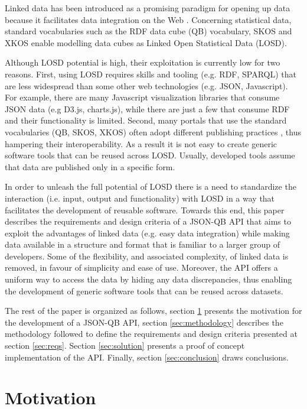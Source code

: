\documentclass{llncs}
\begin{document}
Linked data has been introduced as a promising paradigm for opening up data because it facilitates data integration on the Web \cite{Bizer:2009}. Concerning statistical data, standard vocabularies such as the RDF data cube (QB) vocabulary\cite{Cyganiak:2014:W3C}, SKOS\cite{Miles:2009:W3C} and XKOS\cite{XKOS} enable modelling data cubes as Linked Open Statistical Data (LOSD). 

Although LOSD potential is high, their exploitation is currently low for two reasons. First, using LOSD requires skills and tooling (e.g. RDF, SPARQL) that are less widespread than some other web technologies (e.g. JSON, Javascript). For example, there are many Javascript visualization libraries that consume JSON data (e.g D3.js, charts.js), while there are just a few that consume RDF and their functionality is limited. Second, many portals that use the standard vocabularies (QB, SKOS, XKOS) often adopt different publishing practices \cite{KalampokisChallenges}, thus hampering their interoperability. As a result it is not easy to create generic software tools that can be reused across LOSD. Usually, developed tools assume that data are published only in a specific form.

In order to unleash the full potential of LOSD there is a need to standardize the interaction (i.e. input, output and functionality) with LOSD
in a way that facilitates the development of reusable software. Towards this end, this paper describes the requirements and design criteria of a JSON-QB API that aims to exploit the advantages of linked data (e.g. easy data integration) while making data available in a structure and format that is familiar to a larger group of developers. Some of the flexibility, and associated complexity, of linked data is removed, in favour of simplicity and ease of use. Moreover, the API  offers a uniform way to access the data by hiding any data discrepancies, thus enabling the development of generic software tools that can be reused across datasets. 

The rest of the paper is organized as follows, section \ref{sec:motivation} presents the motivation for the development of a JSON-QB API, section \ref{sec:methodology} describes the methodology followed to define the requirements and design criteria presented at section \ref{sec:reqs}. Section \ref{sec:solution} presents a proof of concept implementation of the API. Finally, section \ref{sec:conclusion} draws conclusions. 

\section{Motivation}\label{sec:motivation}
\end{document}
